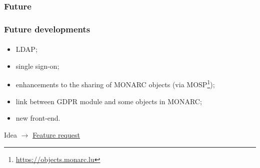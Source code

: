 \subsubsection{Future}
\begin{frame}
    \frametitle{Future developments}
    \framesubtitle{}
    \begin{itemize}
        \item LDAP;
        \item single sign-on;
        \item enhancements to the sharing of MONARC objects (via MOSP\footnote{\url{https://objects.monarc.lu}});
        \item link between GDPR module and some objects in MONARC;
        \item new front-end.
    \end{itemize}
    \bigskip
    Idea
    $\rightarrow$
    \href{https://github.com/monarc-project/MonarcAppFO/issues/new?labels=feature+request}{Feature request}
\end{frame}
